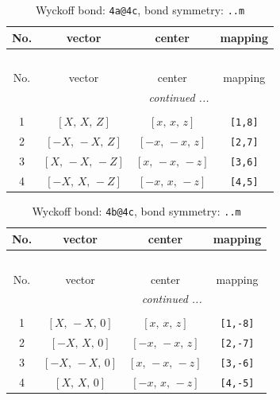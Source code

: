 \documentclass[fleqn,8pt]{jsarticle}
\begin{document}
\begin{longtable}{cccc}
\caption{Wyckoff bond: {\tt 4a@4c}, bond symmetry: {\tt ..m}}
 \\
 \hline \hline
No. & vector & center & mapping \\ \hline \endfirsthead

\multicolumn{3}{l}{\tablename\ \thetable{}} \\
 \hline \hline
No. & vector & center & mapping \\ \hline \endhead

 \hline \hline
\multicolumn{3}{r}{\footnotesize\it continued ...} \\ \endfoot

 \hline \hline
\multicolumn{3}{r}{} \\ \endlastfoot

1 & $\left[ X,\, X,\, Z \right]$ & $\left[ x,\, x,\, z \right]$ & {\tt [1,8]} \\ \hline
2 & $\left[ - X,\, - X,\, Z \right]$ & $\left[ - x,\, - x,\, z \right]$ & {\tt [2,7]} \\ \hline
3 & $\left[ X,\, - X,\, - Z \right]$ & $\left[ x,\, - x,\, - z \right]$ & {\tt [3,6]} \\ \hline
4 & $\left[ - X,\, X,\, - Z \right]$ & $\left[ - x,\, x,\, - z \right]$ & {\tt [4,5]} \\
\end{longtable}
\renewcommand{\arraystretch}{1.2}
\begin{longtable}{cccc}
\caption{Wyckoff bond: {\tt 4b@4c}, bond symmetry: {\tt ..m}}
 \\
 \hline \hline
No. & vector & center & mapping \\ \hline \endfirsthead

\multicolumn{3}{l}{\tablename\ \thetable{}} \\
 \hline \hline
No. & vector & center & mapping \\ \hline \endhead

 \hline \hline
\multicolumn{3}{r}{\footnotesize\it continued ...} \\ \endfoot

 \hline \hline
\multicolumn{3}{r}{} \\ \endlastfoot

1 & $\left[ X,\, - X,\, 0 \right]$ & $\left[ x,\, x,\, z \right]$ & {\tt [1,-8]} \\ \hline
2 & $\left[ - X,\, X,\, 0 \right]$ & $\left[ - x,\, - x,\, z \right]$ & {\tt [2,-7]} \\ \hline
3 & $\left[ - X,\, - X,\, 0 \right]$ & $\left[ x,\, - x,\, - z \right]$ & {\tt [3,-6]} \\ \hline
4 & $\left[ X,\, X,\, 0 \right]$ & $\left[ - x,\, x,\, - z \right]$ & {\tt [4,-5]} \\
\end{longtable}
\end{document}
